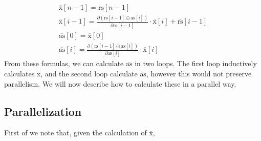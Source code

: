 \documentclass{article}
\newcommand{\ors}{\overline{\text{rs}}}
\newcommand{\rs}{\text{rs}}
\newcommand{\oas}{\overline{\text{as}}}
\newcommand{\xo}{\overline{\text{x}}}
\newcommand{\as}{\text{as}}
\begin{document}
\begin{align*}
	\xo [n-1] = \rs [n-1]      \\
	\xo [i-1] = \frac{\partial (\rs [i-1] \odot \as[i])}{\partial \rs[i-1]}
	\cdot \xo[i]   + \ors[i-1] \\
	\oas [0] = \xo[0]          \\
	\oas [i] = \frac{\partial (\rs [i-1] \odot \as[i])}{\partial \as[i]}
	\cdot
	\xo[i]
\end{align*}
From these formulas, we can calculate \(\oas\) in two loops.
The first loop inductively calculates \(\xo\),
and the second loop calculate \(\oas\),
however this would not preserve parallelism. We will now describe how to
calculate these in a parallel way.
\subsection{Parallelization}
First of we note that,
given the calculation of \(\xo\),

\newpage
\end{document}
